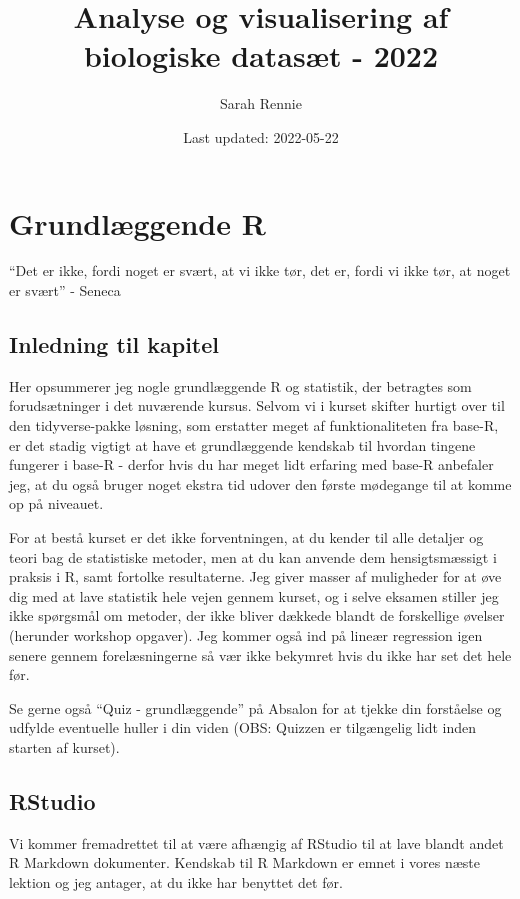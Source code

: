 \documentclass[
]{book}
\title{Analyse og visualisering af biologiske datasæt - 2022}
\author{Sarah Rennie}
\date{Last updated: 2022-05-22}
\begin{document}
\maketitle

{
\setcounter{tocdepth}{1}
\tableofcontents
}
\hypertarget{baser}{%
\chapter{Grundlæggende R}\label{baser}}

``Det er ikke, fordi noget er svært, at vi ikke tør, det er, fordi vi ikke tør, at noget er svært'' - Seneca

\hypertarget{inledning-til-kapitel}{%
\section{Inledning til kapitel}\label{inledning-til-kapitel}}

Her opsummerer jeg nogle grundlæggende R og statistik, der betragtes som forudsætninger i det nuværende kursus. Selvom vi i kurset skifter hurtigt over til den tidyverse-pakke løsning, som erstatter meget af funktionaliteten fra base-R, er det stadig vigtigt at have et grundlæggende kendskab til hvordan tingene fungerer i base-R - derfor hvis du har meget lidt erfaring med base-R anbefaler jeg, at du også bruger noget ekstra tid udover den første mødegange til at komme op på niveauet.

For at bestå kurset er det ikke forventningen, at du kender til alle detaljer og teori bag de statistiske metoder, men at du kan anvende dem hensigtsmæssigt i praksis i R, samt fortolke resultaterne. Jeg giver masser af muligheder for at øve dig med at lave statistik hele vejen gennem kurset, og i selve eksamen stiller jeg ikke spørgsmål om metoder, der ikke bliver dækkede blandt de forskellige øvelser (herunder workshop opgaver). Jeg kommer også ind på lineær regression igen senere gennem forelæsningerne så vær ikke bekymret hvis du ikke har set det hele før.

Se gerne også ``Quiz - grundlæggende'' på Absalon for at tjekke din forståelse og udfylde eventuelle huller i din viden (OBS: Quizzen er tilgængelig lidt inden starten af kurset).

\hypertarget{rstudio}{%
\section{RStudio}\label{rstudio}}

Vi kommer fremadrettet til at være afhængig af RStudio til at lave blandt andet R Markdown dokumenter. Kendskab til R Markdown er emnet i vores næste lektion og jeg antager, at du ikke har benyttet det før.
\end{document}
